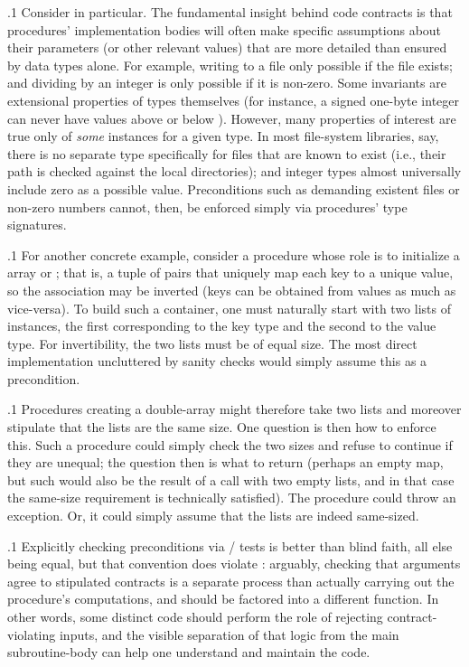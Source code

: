 \documentclass[11pt, twocolumn]{article}
\begin{document}
\p.1{%
Consider  in particular. The fundamental insight
behind code contracts is that procedures' implementation
bodies will often make specific assumptions about
their parameters (or other relevant values) that are
more detailed than ensured by data types alone.
For example, writing to a file only possible if the
file exists; and dividing by an integer is only
possible if it is non-zero. Some invariants
are extensional properties of types themselves (for
instance, a signed one-byte integer can never have
values above  or below ). However,
many properties of interest are true only of
\textit{some} instances for a given type. In most
file-system libraries, say, there is no separate
type specifically for files that are known to
exist (i.e., their path is checked against the local
directories); and integer types almost
universally include zero as a possible value.
Preconditions such as demanding existent files
or non-zero numbers cannot, then, be enforced
simply via procedures' type signatures.
}%

\p.1{%
For another concrete example, consider a procedure
whose role is to initialize a 
array or ; that is, a tuple of pairs that uniquely map
each key to a unique value, so the association
may be inverted (keys can be obtained from values
as much as vice-versa). To build such a container,
one must naturally start with two lists of instances,
the first corresponding to the key type and the
second to the value type. For invertibility,
the two lists must be of equal size. The most
direct implementation \mdash{} uncluttered by sanity
checks \mdash{} would simply assume this as a precondition.
}%

\p.1{%
Procedures creating a double-array might therefore
take two lists and moreover stipulate that the
lists are the same size. One question is then
how to enforce this. Such a procedure could simply
check the two sizes and refuse to continue if
they are unequal; the question then is
what to return (perhaps an empty map, but
such would also be the result of a call with
two empty lists, and in that case the same-size
requirement is technically satisfied). The
procedure could throw an exception. Or, it could
simply assume that the lists are indeed same-sized.
}%

\p.1{%
Explicitly checking preconditions
via / tests is better than blind faith, all else being
equal, but that convention does violate
: arguably, checking
that arguments agree to stipulated contracts
is a separate process than actually carrying out
the procedure's computations, and should be factored
into a different function. In other words, some
distinct code should perform the 
role of rejecting contract-violating inputs,
and the visible separation of that logic from
the main subroutine-body can help one
understand and maintain the code.
}%
\end{document}
